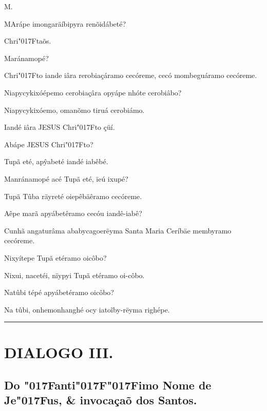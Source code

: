 \documentclass[openany,titlepage,12pt]{book}
\renewcommand{\chaptermark}[1]{\markboth{#1}{}}
\renewcommand{\sectionmark}[1]{\gdef\rightmark{#1}}
\newcommand{\lgS}{\char"017F}
\newcommand{\lgSS}{\char"017F\char"017F}
\newcommand{\comecalista}[5]{
    \hspace*{-11.7pt}
    \begin{minipage}[t]{0.08\linewidth}
        \flushright #1\\#2
    \end{minipage}
    \hspace{0pt}
    \begin{minipage}[t]{0.94\linewidth}
        \lettrine
        [findent =2pt, nindent=0pt,  lines=2]
        {#3}{#4}#5
    \end{minipage}
    \vspace*{-3pt}
}
\begin{document}
\comecalista{M.}{}{M}{A}{rápe imongaräíbipyra renõidábeté?}
\vspace{4pt}
\begin{altereven}
    \item Chri\lgS taõs.
    \item Maránamopé?
    \item Chri\lgS to iande iâra rerobiaçáramo cecóreme, cecó
    mombeguáramo cecóreme.
    \item Niapycykixóépemo cerobiaçâra opyápe nhóte cerobiâbo?
    \item Niapycykixóemo, omanõmo tiruá cerobiámo.
    \item Iandé iâra JESUS Chri\lgS to çüí.
    \item Abápe JESUS Chri\lgS to?
    \item Tupã eté, apŷabeté iandé iabêbé.
    \item Manránamopé acé Tupã eté, ïeú ixupé?
    \item Tupã Tûba räyreté oiepêbäêramo cecóreme.
    \item Aêpe marã apyábetêramo cecóu iandê-iabê?
    \item Cunhã angaturâma ababycagoerëyma\linebreak
    Santa Maria Ceríbäe membyramo cecó\linebreak reme.
    \item Nixyítepe Tupã etéramo oicôbo?
    \item Nixui, nacetéi, nïypyi Tupã etéramo oi-côbo.
    \item Natûbi tépé apyábetéramo oicôbo?
    \item Na tûbi, onhemonhanghé ocy iatoĩby-rëyma righépe.
\end{altereven}

\vspace{3pt}
\par\noindent\rule{\textwidth}{0.4pt}
\unskip\vspace{5pt}
\section{DIALOGO III.}
\unskip\vspace{-3pt}
\subsection{Do \lgS anti\lgSS imo Nome de Je\lgS us, \&
            invocaçaõ dos Santos.}

\chaptermark{Dialogo III.}
\sectionmark{da invocaçaõ dos Santos.}
\end{document}
